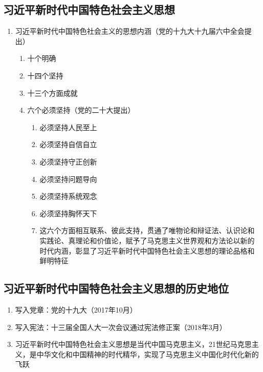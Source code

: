 \documentclass{ctexart}
\numberwithin{figure}{section}
\numberwithin{equation}{section}
\begin{document}
    \subsection{习近平新时代中国特色社会主义思想}
        \begin{enumerate}
            \item 习近平新时代中国特色社会主义的思想内涵（党的十九大十九届六中全会提出）
            \begin{enumerate}
                \item 十个明确
                \item 十四个坚持
                \item 十三个方面成就
                \item 六个必须坚持（党的二十大提出）
                \begin{enumerate}
                    \item 必须坚持人民至上
                    \item 必须坚持自信自立
                    \item 必须坚持守正创新
                    \item 必须坚持问题导向
                    \item 必须坚持系统观念
                    \item 必须坚持胸怀天下
                    \item 这六个方面相互联系、彼此支持，贯通了唯物论和辩证法、认识论和实践论、真理论和价值论，赋予了马克思主义世界观和方法论以新的时代内涵，彰显了习近平新时代中国特色社会主义思想的理论品格和鲜明特征
                \end{enumerate}
            \end{enumerate}
        \end{enumerate}
    \subsection{习近平新时代中国特色社会主义思想的历史地位}
        \begin{enumerate}
            \item 写入党章：党的十九大（2017年10月）
            \item 写入宪法：十三届全国人大一次会议通过宪法修正案（2018年3月）
            \item 习近平新时代中国特色社会主义思想是当代中国马克思主义，21世纪马克思主义，是中华文化和中国精神的时代精华，实现了马克思主义中国化时代化新的飞跃
        \end{enumerate}
\end{document}
